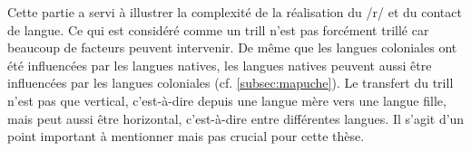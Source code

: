 Cette partie a servi à illustrer la complexité de la réalisation du /r/ et du contact de langue. Ce qui est considéré comme un trill n'est pas forcément trillé car beaucoup de facteurs peuvent intervenir. De même que les langues coloniales ont été influencées par les langues natives, les langues natives peuvent aussi être influencées par les langues coloniales (cf. \autoref{subsec:mapuche}). Le transfert du trill n'est pas que vertical, c'est-à-dire depuis une langue mère vers une langue fille, mais peut aussi être horizontal, c'est-à-dire entre différentes langues. Il s'agit d'un point important à mentionner mais pas crucial pour cette thèse.

